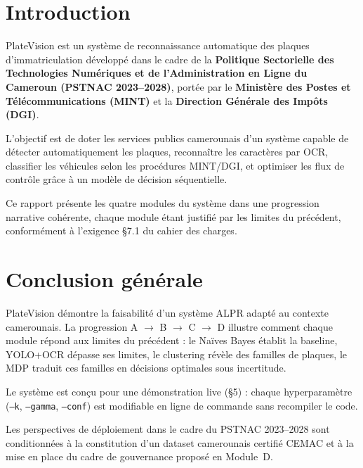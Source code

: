 \documentclass[12pt, a4paper]{report}
\begin{document}
\chapter*{Introduction}

PlateVision est un système de reconnaissance automatique des plaques
d'immatriculation développé dans le cadre de la \textbf{Politique
Sectorielle des Technologies Numériques et de l'Administration en Ligne
du Cameroun (PSTNAC 2023–2028)}, portée par le \textbf{Ministère des
Postes et Télécommunications (MINT)} et la \textbf{Direction Générale
des Impôts (DGI)}.

L'objectif est de doter les services publics camerounais d'un système
capable de détecter automatiquement les plaques, reconnaître les caractères
par OCR, classifier les véhicules selon les procédures MINT/DGI, et
optimiser les flux de contrôle grâce à un modèle de décision séquentielle.

Ce rapport présente les quatre modules du système dans une progression
narrative cohérente, chaque module étant justifié par les limites du
précédent, conformément à l'exigence §7.1 du cahier des charges.







\chapter*{Conclusion g\'{e}n\'{e}rale}

PlateVision d\'{e}montre la faisabilit\'{e} d'un syst\`{e}me ALPR adapt\'{e}
au contexte camerounais. La progression A $\rightarrow$ B $\rightarrow$ C
$\rightarrow$ D illustre comment chaque module r\'{e}pond aux limites du
pr\'{e}c\'{e}dent : le Naïves Bayes \'{e}tablit la baseline, YOLO+OCR
d\'{e}passe ses limites, le clustering r\'{e}v\`{e}le des familles de plaques,
le MDP traduit ces familles en d\'{e}cisions optimales sous incertitude.

Le syst\`{e}me est con\c{c}u pour une d\'{e}monstration live (§5) :
chaque hyperparam\`{e}tre (\texttt{--k}, \texttt{--gamma}, \texttt{--conf})
est modifiable en ligne de commande sans recompiler le code.

Les perspectives de d\'{e}ploiement dans le cadre du PSTNAC 2023--2028 sont
conditionn\'{e}es \`{a} la constitution d'un dataset camerounais certifi\'{e}
CEMAC et \`{a} la mise en place du cadre de gouvernance propos\'{e} en
Module~D.
\end{document}
